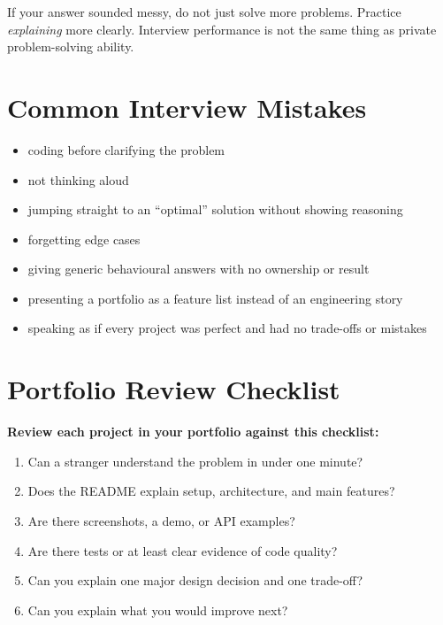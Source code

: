 \documentclass[12pt, a4paper, oneside]{book}
\begin{document}
\begin{interviewbox}
If your answer sounded messy, do not just solve more problems. Practice \emph{explaining} more clearly. Interview performance is not the same thing as private problem-solving ability.
\end{interviewbox}

\section{Common Interview Mistakes}

\begin{itemize}[leftmargin=2em]
    \item coding before clarifying the problem
    \item not thinking aloud
    \item jumping straight to an ``optimal'' solution without showing reasoning
    \item forgetting edge cases
    \item giving generic behavioural answers with no ownership or result
    \item presenting a portfolio as a feature list instead of an engineering story
    \item speaking as if every project was perfect and had no trade-offs or mistakes
\end{itemize}

\section{Portfolio Review Checklist}

\begin{exercisebox}
\textbf{Review each project in your portfolio against this checklist:}
\begin{enumerate}[leftmargin=2em]
    \item Can a stranger understand the problem in under one minute?
    \item Does the README explain setup, architecture, and main features?
    \item Are there screenshots, a demo, or API examples?
    \item Are there tests or at least clear evidence of code quality?
    \item Can you explain one major design decision and one trade-off?
    \item Can you explain what you would improve next?
\end{enumerate}
\end{exercisebox}
\end{document}
